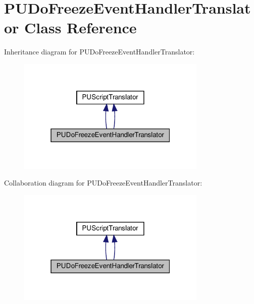 \hypertarget{classPUDoFreezeEventHandlerTranslator}{}\section{P\+U\+Do\+Freeze\+Event\+Handler\+Translator Class Reference}
\label{classPUDoFreezeEventHandlerTranslator}


Inheritance diagram for P\+U\+Do\+Freeze\+Event\+Handler\+Translator\+:
\nopagebreak
\begin{figure}[H]
\begin{center}
\leavevmode
\includegraphics[width=256pt]{classPUDoFreezeEventHandlerTranslator__inherit__graph}
\end{center}
\end{figure}


Collaboration diagram for P\+U\+Do\+Freeze\+Event\+Handler\+Translator\+:
\nopagebreak
\begin{figure}[H]
\begin{center}
\leavevmode
\includegraphics[width=256pt]{classPUDoFreezeEventHandlerTranslator__coll__graph}
\end{center}
\end{figure}
